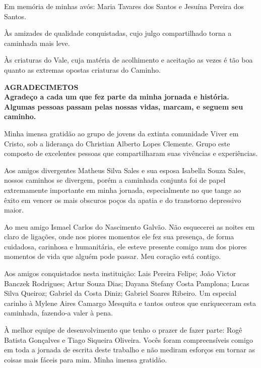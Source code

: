 \documentclass[12pt,a4paper,oneside,brazil]{abntex2}
\begin{document}
Em memória de minhas avós: Maria Tavares dos Santos e
Jesuína Pereira dos Santos.

\vspace{10mm}

Às amizades de qualidade conquistadas, cujo julgo compartilhado
torna a caminhada mais leve.

\vspace{30mm}


Às criaturas do Vale, cuja matéria de acolhimento e aceitação
as vezes é tão boa quanto as extremas opostas criaturas do Caminho.



\clearpage

\centering
\ABNTEXchapterfont\bfseries{\textsc{\MakeUppercase{Agradecimetos}}}\\
\vspace*{3cm}
\justifying
\normalfont
Agradeço a cada um que fez parte da minha jornada e história. Algumas pessoas
passam pelas nossas vidas, marcam, e seguem seu caminho.

Minha imensa gratidão ao grupo de jovens da extinta comunidade Viver em Cristo,
sob a liderança do Christian Alberto Lopes Clemente. Grupo este composto de excelentes
pessoas que compartilharam suas vivências e experiências.

Aos amigos divergentes Matheus Silva Sales e sua esposa Isabella Souza Sales,
nossos caminhos se divergem, porém a caminhada conjunta foi de papel extremamente
importante em minha jornada, especialmente no que tange ao êxito em vencer os mais
obscuros poços da apatia e do transtorno depressivo maior. 

Ao meu amigo Ismael Carlos do Nascimento Galvão.
Não esquecerei as noites em claro de ligações, onde nos piores
momentos ele fez sua presença, de forma cuidadosa, carinhosa e
humanitária, ele esteve presente comigo num dos piores momentos
de vida que alguém pode passar.
Meu coração está contigo.

Aos amigos conquistados nesta instituição: Lais Pereira Felipe;
João Victor Banczek Rodrigues;
Artur Souza Dias;
Dayana Stefany Costa Pamplona;
Lucas Silva Queiroz;
Gabriel da Costa Diniz;
Gabriel Soares Ribeiro.
Um especial carinho à Mylene Aires Camargo Mesquita
e tantos outros que enriqueceram esta caminhada, fazendo-a valer
à pena.

À melhor equipe de desenvolvimento que tenho o prazer de fazer parte:
Rogê Batista Gonçalves e Tiago Siqueira Oliveira. Vocês foram compreensíveis
comigo em toda a jornada de escrita deste trabalho e não mediram esforços
em tornar as coisas mais fáceis para mim. Minha imensa gratidão.
\end{document}
